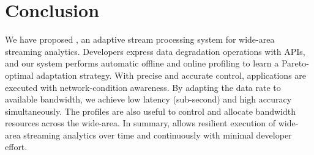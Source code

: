 \section{Conclusion}
\label{sec:conclusion}

We have proposed \sysname{}, an adaptive stream processing system for wide-area
streaming analytics. Developers express data degradation operations with
\maybe{} APIs, and our system performs automatic offline and online profiling to
learn a Pareto-optimal adaptation strategy. With precise and accurate control,
\sysname{} applications are executed with network-condition awareness.  By
adapting the data rate to available bandwidth, we achieve low latency
(sub-second) and high accuracy simultaneously. The profiles are also useful to
control and allocate bandwidth resources across the wide-area. In summary,
\sysname{} allows resilient execution of wide-area streaming analytics over time
and continuously with minimal developer effort.

